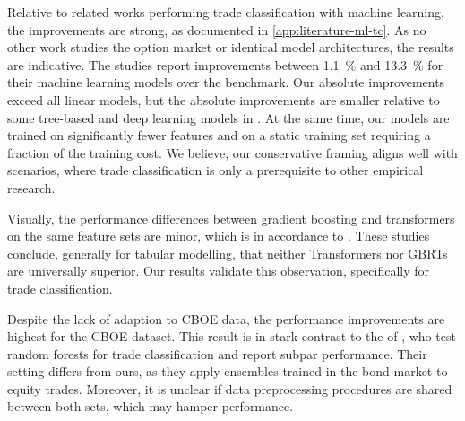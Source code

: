Relative to related works performing trade classification with machine learning, the improvements are strong, as documented in \cref{app:literature-ml-tc}. As no other work studies the option market or identical model architectures, the results are indicative. The studies report improvements between \SI{1.1}{\percent} and \SI{13.3}{\percent} for their machine learning models over the benchmark. Our absolute improvements exceed all linear models, but the absolute improvements are smaller relative to some tree-based and deep learning models in \textcite[][49]{ronenMachineLearningTrade2022}. At the same time, our models are trained on significantly fewer features and on a static training set requiring a fraction of the training cost. We believe, our conservative framing aligns well with scenarios, where trade classification is only a prerequisite to other empirical research.

Visually, the performance differences between gradient boosting and transformers on the same feature sets are minor, which is in accordance to \textcites{grinsztajnWhyTreebasedModels2022}{gorishniyRevisitingDeepLearning2021}. These studies conclude, generally for tabular modelling, that neither Transformers nor \glspl{GBRT} are universally superior. Our results validate this observation, specifically for trade classification.


Despite the lack of adaption to \gls{CBOE} data, the performance improvements are highest for the \gls{CBOE} dataset. This result is in stark contrast to the of \textcite[][32]{ronenMachineLearningTrade2022}, who test random forests for trade classification and report subpar performance. Their setting differs from ours, as they apply ensembles trained in the bond market to equity trades. Moreover, it is unclear if data preprocessing procedures are shared between both sets, which may hamper performance. 


